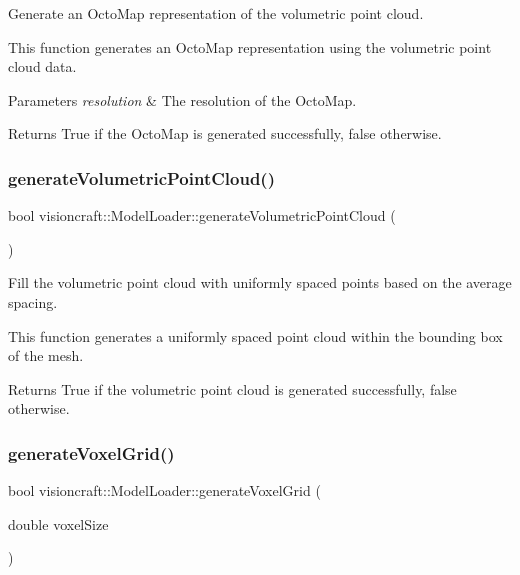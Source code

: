 Generate an Octo\+Map representation of the volumetric point cloud. 

This function generates an Octo\+Map representation using the volumetric point cloud data.


\begin{DoxyParams}{Parameters}
{\em resolution} & The resolution of the Octo\+Map. \\
\hline
\end{DoxyParams}
\begin{DoxyReturn}{Returns}
True if the Octo\+Map is generated successfully, false otherwise. 
\end{DoxyReturn}
\mbox{\label{classvisioncraft_1_1ModelLoader_ac8c840ea98ceb68cedb9d85ef93d7148}} 
\subsubsection{\texorpdfstring{generate\+Volumetric\+Point\+Cloud()}{generateVolumetricPointCloud()}}
{\footnotesize\ttfamily bool visioncraft\+::\+Model\+Loader\+::generate\+Volumetric\+Point\+Cloud (\begin{DoxyParamCaption}{ }\end{DoxyParamCaption})}



Fill the volumetric point cloud with uniformly spaced points based on the average spacing. 

This function generates a uniformly spaced point cloud within the bounding box of the mesh.

\begin{DoxyReturn}{Returns}
True if the volumetric point cloud is generated successfully, false otherwise. 
\end{DoxyReturn}
\mbox{\label{classvisioncraft_1_1ModelLoader_ae3d3cc69a0d2c80d50cbc125f604807c}} 
\subsubsection{\texorpdfstring{generate\+Voxel\+Grid()}{generateVoxelGrid()}}
{\footnotesize\ttfamily bool visioncraft\+::\+Model\+Loader\+::generate\+Voxel\+Grid (\begin{DoxyParamCaption}\item[{double}]{voxel\+Size }\end{DoxyParamCaption})}



